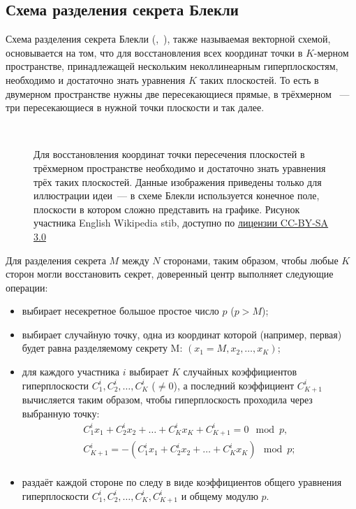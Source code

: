 \subsection[Схема Блекли]{Схема разделения секрета Блекли}

Схема разделения секрета Блекли (,~\cite{Blackley:1979}), также называемая векторной схемой, основывается на том, что для восстановления всех координат точки в $K$-мерном пространстве, принадлежащей нескольким неколлинеарным гиперплоскостям, необходимо и достаточно знать уравнения $K$ таких плоскостей. То есть в двумерном пространстве нужны две пересекающиеся прямые, в трёхмерном ~--- три пересекающиеся в нужной точки плоскости и так далее.

\begin{figure}[thb]
	\centering
	~~~~
	\caption{Для восстановления координат точки пересечения плоскостей в трёхмерном пространстве необходимо и достаточно знать уравнения трёх таких плоскостей. Данные изображения приведены только для иллюстрации идеи~--- в схеме Блекли используется конечное поле, плоскости в котором сложно представить на графике. Рисунок участника English Wikipedia stib, доступно по \href{https://creativecommons.org/licenses/by-sa/3.0/deed.ru}{лицензии CC-BY-SA 3.0}}
\end{figure}

Для разделения секрета $M$ между $N$ сторонами, таким образом, чтобы любые $K$ сторон могли восстановить секрет, доверенный центр выполняет следующие операции:
\begin{itemize}
	\item выбирает несекретное большое простое число $p$ ($p > M$);
	\item выбирает случайную точку, одна из координат которой (например, первая) будет равна разделяемому секрету M: $(x_1 = M, x_2, \dots, x_K)$;
	\item для каждого участника $i$ выбирает $K$ случайных коэффициентов гиперплоскости $C^i_1, C^i_2, \dots, C^i_{K}$ ($\ne 0$), а последний коэффициент $C^i_{K+1}$ вычисляется таким образом, чтобы гиперплоскость проходила через выбранную точку:
		\[ \begin{array}{l}
			C^i_1 x_1 + C^i_2 x_2 + \dots + C^i_K x_K + C^i_{K+1} = 0 \mod p, \\
			C^i_{K+1} = - ( C^i_1 x_1 + C^i_2 x_2 + \dots + C^i_K x_K ) \mod p; \\
		\end{array} \]
	\item раздаёт каждой стороне по следу в виде коэффициентов общего уравнения гиперплоскости $C^i_1, C^i_2, \dots, C^i_{K}, C^i_{K+1}$ и общему модулю $p$.
\end{itemize}

